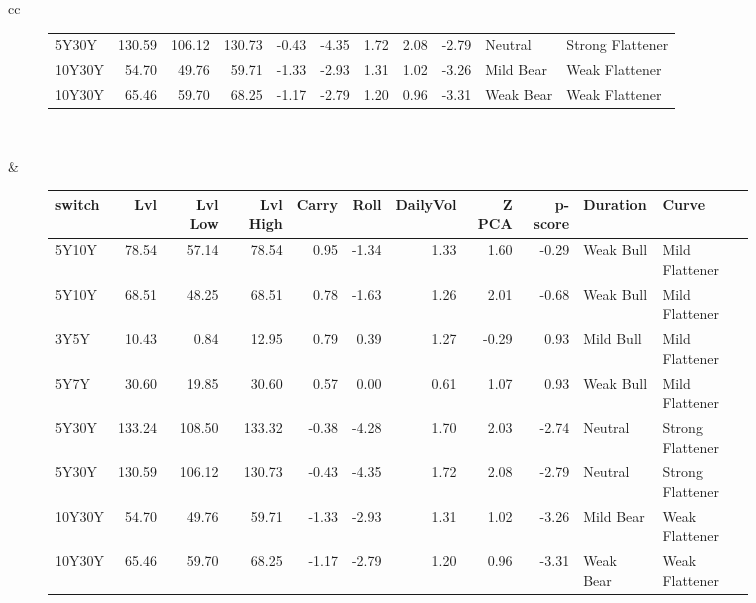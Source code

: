\documentclass[a4paper,oneside]{report}
\begin{document}
\begin{figure}[htbp]
\begin{tabular}[c]{cc}
\begin{subfigure}[c]{0.5\textwidth}
\begin{adjustbox}{max width=\textwidth}
\begin{tabular}{lrrrrrrrrll}
   5Y30Y &  130.59 &   106.12 &    130.73 &  -0.43 & -4.35 &      1.72 &   2.08 &    -2.79 &      Neutral &  Strong Flattener \\
   10Y30Y &   54.70 &    49.76 &     59.71 &  -1.33 & -2.93 &      1.31 &   1.02 &    -3.26 &    Mild Bear &    Weak Flattener \\
   10Y30Y &   65.46 &    59.70 &     68.25 &  -1.17 & -2.79 &      1.20 &   0.96 &    -3.31 &    Weak Bear &    Weak Flattener \\
\hline
\end{tabular}
\end{adjustbox}
\end{subfigure}\\
 
 

\begin{subfigure}[c]{0.5\textwidth}
 
 \null\hfill 
 \end{subfigure}&
 
\begin{subfigure}[c]{0.5\textwidth}
\begin{adjustbox}{max width=\textwidth}
\begin{tabular}{lrrrrrrrrll}
\hline
 switch &     Lvl &  Lvl Low &  Lvl High &  Carry &  Roll &  DailyVol &  Z PCA &  p-score &   Duration &             Curve \\
\hline
  5Y10Y &   78.54 &    57.14 &     78.54 &   0.95 & -1.34 &      1.33 &   1.60 &    -0.29 &  Weak Bull &    Mild Flattener \\
  5Y10Y &   68.51 &    48.25 &     68.51 &   0.78 & -1.63 &      1.26 &   2.01 &    -0.68 &  Weak Bull &    Mild Flattener \\
   3Y5Y &   10.43 &     0.84 &     12.95 &   0.79 &  0.39 &      1.27 &  -0.29 &     0.93 &  Mild Bull &    Mild Flattener \\
   5Y7Y &   30.60 &    19.85 &     30.60 &   0.57 &  0.00 &      0.61 &   1.07 &     0.93 &  Weak Bull &    Mild Flattener \\
  5Y30Y &  133.24 &   108.50 &    133.32 &  -0.38 & -4.28 &      1.70 &   2.03 &    -2.74 &    Neutral &  Strong Flattener \\
  5Y30Y &  130.59 &   106.12 &    130.73 &  -0.43 & -4.35 &      1.72 &   2.08 &    -2.79 &    Neutral &  Strong Flattener \\
 10Y30Y &   54.70 &    49.76 &     59.71 &  -1.33 & -2.93 &      1.31 &   1.02 &    -3.26 &  Mild Bear &    Weak Flattener \\
 10Y30Y &   65.46 &    59.70 &     68.25 &  -1.17 & -2.79 &      1.20 &   0.96 &    -3.31 &  Weak Bear &    Weak Flattener \\
\hline
\end{tabular}
\end{adjustbox}
 \end{subfigure}\\
 

\end{tabular}
\end{figure}
\end{document}
